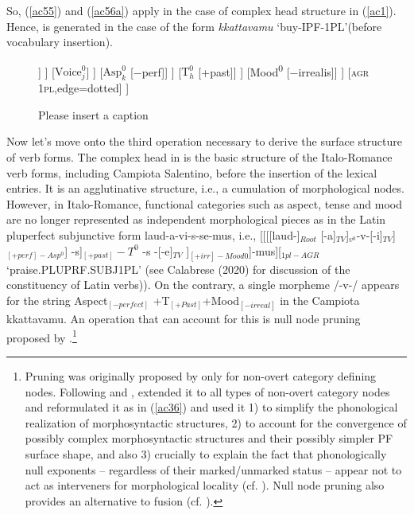 \documentclass[output=paper]{langscibook}
\begin{document}
So, (\ref{ac55}) and (\ref{ac56a}) apply in the case of complex head structure in (\ref{ac1}).  Hence,  is generated in the case of the form \textit{kkattavamu} ‘buy-IPF-1PL’(before vocabulary insertion).

\begin{figure}
\caption{\label{ac57}\color{red}Please insert a caption}
	\begin{forest}
		[Mood\textsuperscript{P}
			[Mood$^0$
				[$\text{T}^0_h$
					[$\text{Asp}^0_k$
						[$\text{Voice}^0_j$
							[v\textsuperscript{0}
								[$\surd{}\text{Root}^0_i$ \textsc{buy}]
								[v\textsuperscript{0}
									[v\textsuperscript{0}]
									[TV]
								]
							]
							[$\text{Voice}^0_j$]
						]
						[$\text{Asp}^0_k$ {[−perf]}]
					]
					[$\text{T}^0_h$ {[+past]}]
				]
				[Mood\textsuperscript{0} {[−irrealis]}]
			]
			[\textsc{agr 1pl},edge=dotted]
		]		
	\end{forest}
\end{figure}

Now let's move onto the third operation necessary to derive the surface structure of verb forms. The complex head in   is the basic structure of the Italo-Romance verb forms, including Campiota Salentino, before the insertion of the lexical entries. It is an agglutinative structure, i.e., a cumulation of morphological nodes. However, in Italo-Romance, functional categories such as aspect, tense and mood are no longer represented as independent morphological pieces as in the Latin pluperfect subjunctive form laud-a-vi-s-se-mus, i.e., [[[[laud-]$_{Root}$ [-a]$_{TV}$]$_{v^0}$-v-[-i]$_{TV}$]$_{[+perf]-Asp^0}$] -s]$_{[+past]}-T^0$  -s -[-e]$_{TV}$ ]$_{[+irr]-Mood0}$]-mus][$_{1pl-AGR}$  ‘praise.PLUPRF.SUBJ1PL’ (see Calabrese (2020) for discussion of the constituency of Latin verbs)). On the contrary, a single morpheme /-v-/ appears for the string Aspect$_{[-perfect]}$ +T$_{[+Past]}$+Mood$_{[-irreal]}$ in the Campiota kkattavamu.  An operation that can account for this is null node pruning proposed by \cite{calabrese2019a}.\footnote{Pruning was originally proposed by \cite{embick2010a} only for non-overt category defining nodes. Following \cite{christopoulos2017a} and \cite{christopoulos2018a}, \cite{calabrese2019a} extended it to all types of non-overt category nodes and reformulated it as in (\ref{ac36}) and used it 1) to simplify the phonological realization of morphosyntactic structures, 2) to account for the convergence of possibly complex morphosyntactic structures and their possibly simpler PF surface shape, and also 3) crucially to explain the fact that phonologically null exponents -- regardless of their marked/unmarked status --  appear not to act as interveners for morphological locality (cf. \cite{embick2010a, calabrese2019a}). Null node pruning also provides an alternative to fusion (cf. \cite{halle1993a}).}
 
\end{document}
